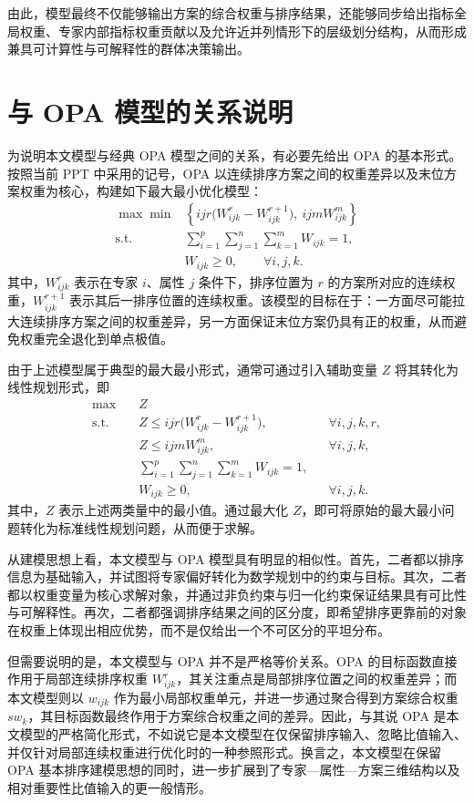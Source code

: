 \documentclass{article}
\begin{document}
由此，模型最终不仅能够输出方案的综合权重与排序结果，还能够同步给出指标全局权重、专家内部指标权重贡献以及允许近并列情形下的层级划分结构，从而形成兼具可计算性与可解释性的群体决策输出。

\section{与 OPA 模型的关系说明}

为说明本文模型与经典 OPA 模型之间的关系，有必要先给出 OPA 的基本形式。按照当前 PPT 中采用的记号，OPA 以连续排序方案之间的权重差异以及末位方案权重为核心，构建如下最大最小优化模型：
\begin{align}
    \max \min & \left\{ijr\bigl(W_{ijk}^{r}-W_{ijk}^{r+1}\bigr),\ ijmW_{ijk}^{m}\right\}\\
  \text{s.t.}  & \sum_{i=1}^{p}\sum_{j=1}^{n}\sum_{k=1}^{m} W_{ijk} =1, \\
  &  W_{ijk}  \ge 0, \qquad \forall i,j,k.
\end{align}
其中，$W_{ijk}^{r}$ 表示在专家 $i$、属性 $j$ 条件下，排序位置为 $r$ 的方案所对应的连续权重，$W_{ijk}^{r+1}$ 表示其后一排序位置的连续权重。该模型的目标在于：一方面尽可能拉大连续排序方案之间的权重差异，另一方面保证末位方案仍具有正的权重，从而避免权重完全退化到单点极值。

由于上述模型属于典型的最大最小形式，通常可通过引入辅助变量 $Z$ 将其转化为线性规划形式，即
\begin{align}
    \max \quad & Z \\
    \text{s.t.}\quad 
    & Z \le ijr\bigl(W_{ijk}^{r}-W_{ijk}^{r+1}\bigr), && \forall i,j,k,r, \\
    & Z \le ijmW_{ijk}^{m}, && \forall i,j,k, \\
    & \sum_{i=1}^{p}\sum_{j=1}^{n}\sum_{k=1}^{m} W_{ijk}=1, & & \\
    & W_{ijk}\ge 0, && \forall i,j,k.
\end{align}
其中，$Z$ 表示上述两类量中的最小值。通过最大化 $Z$，即可将原始的最大最小问题转化为标准线性规划问题，从而便于求解。

从建模思想上看，本文模型与 OPA 模型具有明显的相似性。首先，二者都以排序信息为基础输入，并试图将专家偏好转化为数学规划中的约束与目标。其次，二者都以权重变量为核心求解对象，并通过非负约束与归一化约束保证结果具有可比性与可解释性。再次，二者都强调排序结果之间的区分度，即希望排序更靠前的对象在权重上体现出相应优势，而不是仅给出一个不可区分的平坦分布。

但需要说明的是，本文模型与 OPA 并不是严格等价关系。OPA 的目标函数直接作用于局部连续排序权重 $W_{ijk}^{r}$，其关注重点是局部排序位置之间的权重差异；而本文模型则以 $w_{ijk}$ 作为最小局部权重单元，并进一步通过聚合得到方案综合权重 $sw_k$，其目标函数最终作用于方案综合权重之间的差异。因此，与其说 OPA 是本文模型的严格简化形式，不如说它是本文模型在仅保留排序输入、忽略比值输入、并仅针对局部连续权重进行优化时的一种参照形式。换言之，本文模型在保留 OPA 基本排序建模思想的同时，进一步扩展到了专家—属性—方案三维结构以及相对重要性比值输入的更一般情形。
\end{document}
